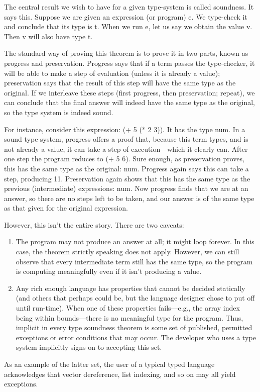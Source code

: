 The central result we wish to have for a given type-system is called soundness.
It says this. Suppose we are given an expression (or program) e. We type-check
it and conclude that its type is t. When we run e, let us say we obtain the
value v. Then v will also have type t.

The standard way of proving this theorem is to prove it in two parts, known as
progress and preservation. Progress says that if a term passes the type-checker,
it will be able to make a step of evaluation (unless it is already a value);
preservation says that the result of this step will have the same type as the
original. If we interleave these steps (first progress, then preservation;
repeat), we can conclude that the final answer will indeed have the same type as
the original, so the type system is indeed sound.

For instance, consider this expression: (+ 5 (* 2 3)). It has the type num. In a
sound type system, progress offers a proof that, because this term types, and is
not already a value, it can take a step of execution—which it clearly can. After
one step the program reduces to (+ 5 6). Sure enough, as preservation proves,
this has the same type as the original: num. Progress again says this can take a
step, producing 11. Preservation again shows that this has the same type as the
previous (intermediate) expressions: num. Now progress finds that we are at an
answer, so there are no steps left to be taken, and our answer is of the same
type as that given for the original expression.

However, this isn’t the entire story. There are two caveats:
\begin{enumerate}
  \item 
The program may not produce an answer at all; it might loop forever. In this
case, the theorem strictly speaking does not apply. However, we can still
observe that every intermediate term still has the same type, so the program is
computing meaningfully even if it isn’t producing a value.
  \item 
Any rich enough language has properties that cannot be decided statically (and
others that perhaps could be, but the language designer chose to put off until
run-time). When one of these properties fails—e.g., the array index being within
bounds—there is no meaningful type for the program. Thus, implicit in every type
soundness theorem is some set of published, permitted exceptions or error
conditions that may occur. The developer who uses a type system implicitly signs
on to accepting this set.
\end{enumerate}
As an example of the latter set, the user of a typical typed language
acknowledges that vector dereference, list indexing, and so on may all yield
exceptions.

